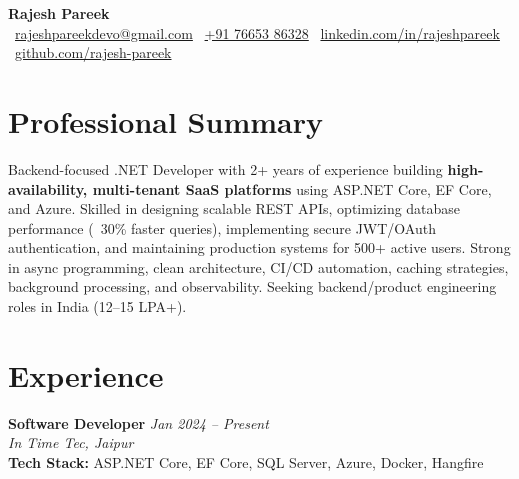 \documentclass[a4paper,10pt]{article}
\begin{document}

\begin{center}
    {\Huge \textbf{Rajesh Pareek}} \\[2pt]
    \small
    \faEnvelope\ \href{mailto:rajeshpareekdevo@gmail.com}{rajeshpareekdevo@gmail.com} \quad
    \faPhone\ \href{tel:+917665386328}{+91 76653 86328} \quad
    \faLinkedin\ \href{https://www.linkedin.com/in/rajeshpareek}{linkedin.com/in/rajeshpareek} \quad
    \faGithub\ \href{https://github.com/rajesh-pareek}{github.com/rajesh-pareek}
\end{center}

\vspace{1mm}

\section*{Professional Summary}
Backend-focused .NET Developer with 2+ years of experience building \textbf{high-availability, multi-tenant SaaS platforms} using ASP.NET Core, EF Core, and Azure. Skilled in designing scalable REST APIs, optimizing database performance (~30\% faster queries), implementing secure JWT/OAuth authentication, and maintaining production systems for 500+ active users. Strong in async programming, clean architecture, CI/CD automation, caching strategies, background processing, and observability. Seeking backend/product engineering roles in India (12–15 LPA+).

\vspace{2mm}

\section*{Experience}

\textbf{Software Developer} \hfill \textit{Jan 2024 -- Present} \\
\textit{In Time Tec, Jaipur} \\
\textbf{Tech Stack:} ASP.NET Core, EF Core, SQL Server, Azure, Docker, Hangfire
\end{document}
